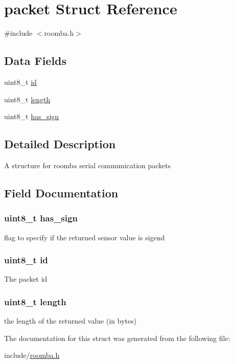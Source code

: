 \hypertarget{structpacket}{\section{packet \-Struct \-Reference}
\label{structpacket}
}


{\ttfamily \#include $<$roomba.\-h$>$}

\subsection*{\-Data \-Fields}
\begin{DoxyCompactItemize}
\item 
uint8\-\_\-t \hyperlink{structpacket_a1e6927fa1486224044e568f9c370519b}{id}
\item 
uint8\-\_\-t \hyperlink{structpacket_ab2b3adeb2a67e656ff030b56727fd0ac}{length}
\item 
uint8\-\_\-t \hyperlink{structpacket_a0511f5c7ac752193798ceb3787081337}{has\-\_\-sign}
\end{DoxyCompactItemize}


\subsection{\-Detailed \-Description}
\-A structure for roomba serial communication packets 

\subsection{\-Field \-Documentation}
\hypertarget{structpacket_a0511f5c7ac752193798ceb3787081337}{
\subsubsection[{has\-\_\-sign}]{\setlength{\rightskip}{0pt plus 5cm}uint8\-\_\-t {\bf has\-\_\-sign}}}\label{structpacket_a0511f5c7ac752193798ceb3787081337}
flag to specify if the returned sensor value is sigend \hypertarget{structpacket_a1e6927fa1486224044e568f9c370519b}{
\subsubsection[{id}]{\setlength{\rightskip}{0pt plus 5cm}uint8\-\_\-t {\bf id}}}\label{structpacket_a1e6927fa1486224044e568f9c370519b}
\-The packet id \hypertarget{structpacket_ab2b3adeb2a67e656ff030b56727fd0ac}{
\subsubsection[{length}]{\setlength{\rightskip}{0pt plus 5cm}uint8\-\_\-t {\bf length}}}\label{structpacket_ab2b3adeb2a67e656ff030b56727fd0ac}
the length of the returned value (in bytes) 

\-The documentation for this struct was generated from the following file\-:\begin{DoxyCompactItemize}
\item 
include/\hyperlink{roomba_8h}{roomba.\-h}\end{DoxyCompactItemize}
